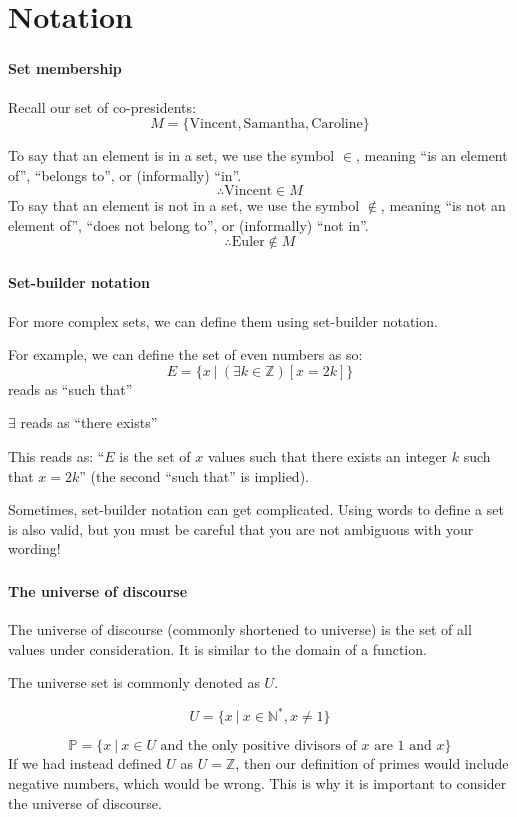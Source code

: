 \documentclass{beamer}
\newenvironment{compactmath}[1][\normalsize]%
	{\begin{minipage}{\textwidth}\vspace{-0.75\baselineskip}#1\begin{equation*}}
	{\end{equation*}\end{minipage}}
\begin{document}
	\section{Notation}
	\begin{frame}
		\frametitle{\secname}
		\framesubtitle{Set membership}
		Recall our set of co-presidents:
		\[M = \{\text{Vincent}, \text{Samantha}, \text{Caroline}\}\]
		
		To say that an element is in a set, we use the symbol $\in$, meaning ``is an element of'', ``belongs to'', or (informally) ``in''.
		\[\therefore \text{Vincent} \in M\]
		To say that an element is not in a set, we use the symbol $\notin$, meaning ``is not an element of'', ``does not belong to'', or (informally) ``not in''.
		\[\therefore \text{Euler} \notin M\]
	\end{frame}
	\begin{frame}
		\frametitle{\secname}
		\framesubtitle{Set-builder notation}
		For more complex sets, we can define them using set-builder notation.

		For example, we can define the set of even numbers as so:
		\[E = \{x\ |\ (\exists k \in \mathbb{Z})[x = 2k]\}\]
		\textbar{} reads as ``such that''

		$\exists$ reads as ``there exists''

		This reads as: ``$E$ is the set of $x$ values such that there exists an integer $k$ such that $x = 2k$'' (the second ``such that'' is implied).

		\scriptsize
		Sometimes, set-builder notation can get complicated. Using words to define a set is also valid, but you must be careful that you are \alert{not} ambiguous with your wording!
	\end{frame}
	\begin{frame}
		\frametitle{\secname}
		\framesubtitle{The universe of discourse}
		The universe of discourse (commonly shortened to universe) is the set of all values under consideration. It is similar to the domain of a function.

		The universe set is commonly denoted as $U$.
		\begin{example}
			\begin{compactmath}
				U = \{x\ |\ x \in \mathbb{N}^*, x \neq 1\}
			\end{compactmath}
			\[\mathbb{P} = \{x\ |\ x \in U \text{ and the only positive divisors of $x$ are $1$ and $x$}\}\]
			If we had instead defined $U$ as $U = \mathbb{Z}$, then our definition of primes would include negative numbers, which would be wrong. This is why it is important to consider the universe of discourse.
		\end{example}
	\end{frame}
\end{document}
